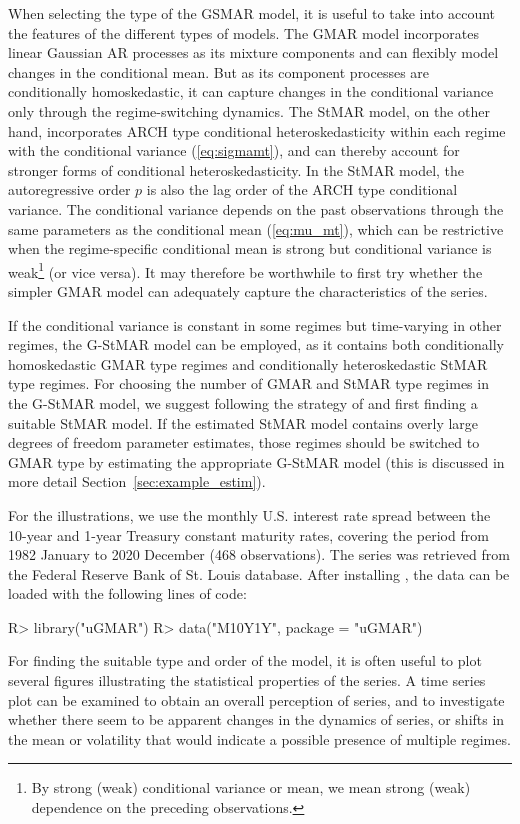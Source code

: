 \documentclass[nojss]{jss} %
\begin{document}
When selecting the type of the GSMAR model, it is useful to take into account the features of the different types of models. The GMAR model incorporates linear Gaussian AR processes as its mixture components and can flexibly model changes in the conditional mean. But as its component processes are conditionally homoskedastic, it can capture changes in the conditional variance only through the regime-switching dynamics. The StMAR model, on the other hand, incorporates ARCH type conditional heteroskedasticity within each regime with the conditional variance (\ref{eq:sigmamt}), and can thereby account for stronger forms of conditional heteroskedasticity. In the StMAR model, the autoregressive order $p$ is also the lag order of the ARCH type conditional variance. The conditional variance depends on the past observations through the same parameters as the conditional mean (\ref{eq:mu_mt}), which can be restrictive when the regime-specific conditional mean is strong but conditional variance is weak\footnote{By strong (weak) conditional variance or mean, we mean strong (weak) dependence on the preceding observations.} (or vice versa). It may therefore be worthwhile to first try whether the simpler GMAR model can adequately capture the characteristics of the series.

If the conditional variance is constant in some regimes but time-varying in other regimes, the G-StMAR model can be employed, as it contains both conditionally homoskedastic GMAR type regimes and conditionally heteroskedastic StMAR type regimes. For choosing the number of GMAR and StMAR type regimes in the G-StMAR model, we suggest following the strategy of \citet[Section 4]{Virolainen:2020} and first finding a suitable StMAR model. If the estimated StMAR model contains overly large degrees of freedom parameter estimates, those regimes should be switched to GMAR type by estimating the appropriate G-StMAR model (this is discussed in more detail Section~\ref{sec:example_estim}).

For the illustrations, we use the monthly U.S. interest rate spread between the 10-year and 1-year Treasury constant maturity rates, covering the period from 1982 January to 2020 December (468 observations). The series was retrieved from the Federal Reserve Bank of St. Louis database. After installing , the data can be loaded with the following lines of code:
%
\begin{CodeChunk}
\begin{CodeInput}
R> library("uGMAR")
R> data("M10Y1Y", package = "uGMAR")
\end{CodeInput}
\end{CodeChunk}
%
For finding the suitable type and order of the model, it is often useful to plot several figures illustrating the statistical properties of the series. A time series plot can be examined to obtain an overall perception of series, and to investigate whether there seem to be apparent changes in the dynamics of series, or shifts in the mean or volatility that would indicate a possible presence of multiple regimes.
\end{document}
